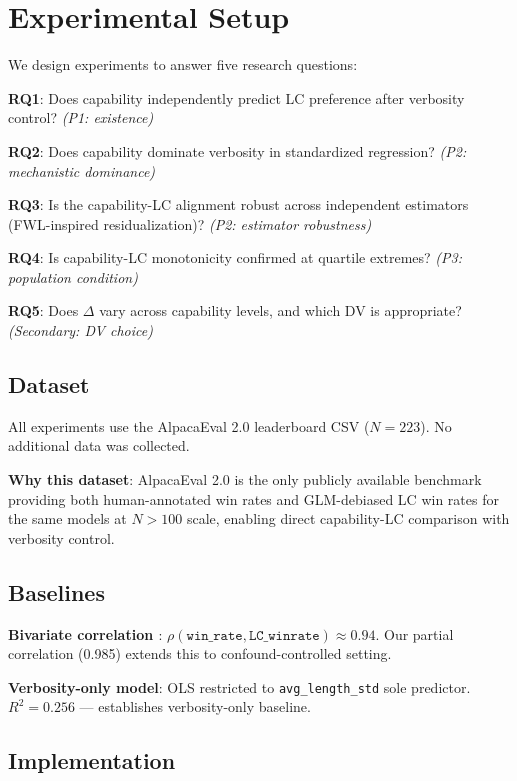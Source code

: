 \section{Experimental Setup}
\label{sec:experiments}

We design experiments to answer five research questions:

\textbf{RQ1}: Does capability independently predict LC preference after verbosity control?
\textit{(P1: existence)}

\textbf{RQ2}: Does capability dominate verbosity in standardized regression?
\textit{(P2: mechanistic dominance)}

\textbf{RQ3}: Is the capability-LC alignment robust across independent estimators
(FWL-inspired residualization)? \textit{(P2: estimator robustness)}

\textbf{RQ4}: Is capability-LC monotonicity confirmed at quartile extremes?
\textit{(P3: population condition)}

\textbf{RQ5}: Does $\Delta$ vary across capability levels, and which DV is appropriate?
\textit{(Secondary: DV choice)}

\subsection{Dataset}

All experiments use the AlpacaEval 2.0 leaderboard CSV ($N=223$). No additional data was
collected.

\textbf{Why this dataset}: AlpacaEval 2.0 is the only publicly available benchmark providing
both human-annotated win rates and GLM-debiased LC win rates for the same models at $N>100$
scale, enabling direct capability-LC comparison with verbosity control.

\subsection{Baselines}

\textbf{Bivariate correlation \citep{Dubois2024LengthControlled}}:
$\rho(\texttt{win\_rate}, \texttt{LC\_winrate}) \approx 0.94$. Our partial correlation (0.985)
extends this to confound-controlled setting.

\textbf{Verbosity-only model}: OLS restricted to \texttt{avg\_length\_std} sole predictor.
$R^2 = 0.256$ --- establishes verbosity-only baseline.

\subsection{Implementation}

